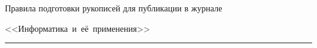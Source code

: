 \def\stat{cont-rus}


{%




\vspace*{-24pt}


\raggedleft\Large \bf%


Правила подготовки рукописей  для публикации в журнале


<<Информатика~и~её~применения>> \vskip 8pt


    \hrule


    \par


 }





\label{st\stat}





\def\tit{\ }





\def\aut{\ }


\def\auf{\ }





\def\leftkol{\ }









\def\rightkol{\ }












\titele{\tit}{\aut}{\auf}{\leftkol}{\rightkol}








\vspace*{-60pt}


